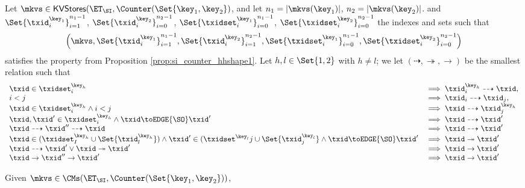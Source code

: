\begin{definition}
\label{def:si_counter_order}
Let $\mkvs \in \mathsf{KVStores}(\ET_{\SI}, \Counter(\Set{\key_1, \key_2})$, and let 
$n_1 = \lvert \mkvs(\key_1) \rvert$, $n_2 = \lvert \mkvs(\key_2) \rvert$. 
and $\Set{\txid_{i}^{\key_1}}_{i=1}^{n_1 - 1}$, $\Set{\txid_{i}^{\key_2}}_{i=0}^{n_2 - 1}$, 
$\Set{\txidset_{i}^{\key_1}}_{i=0}^{n_1-1}$, $\Set{\txidset_{i}^{\key_2}}_{i=0}^{n_2 - 1}$ the indexes 
and sets such that 
\[
    \left(
        \mkvs, \Set{\txid_{i}^{\key_{1}}}_{i=1}^{n_1 - 1}, \Set{\txid^{\key_2}_{i}}_{i=1}^{n_2 - 1}, 
\Set{\txidset_{i}^{\key_1}}_{i=0}^{n_1 - 1}, \Set{\txidset_{i}^{\key_2}}_{i=0}^{n_2-1}
    \right)
\]
satisfies the property from 
Proposition \ref{prop:si_counter_hhshape1}. Let $h, l \in \Set{1,2}$ with $h \neq l$; we 
let $(\dashrightarrow, \twoheadrightarrow, \rightarrow)$ be the smallest relation such that 
\[
\begin{array}{ll}
\txid \in \txidset^{\key_{h}}_{i} &\implies \txid^{\key_{h}}_{i} \dashrightarrow \txid,\\
i < j &\implies \txid_{i} \dashrightarrow \txid_{j},\\
\txid \in \txidset^{\key_{h}}_{i} \land i < j & \implies \txid \dashrightarrow \txid^{\key_{h}}_{j}\\
\txid, \txid' \in \txidset^{\key_{h}}_{i} \land \txid \toEDGE{\SO} \txid' &\implies \txid \dashrightarrow \txid'\\
\txid \dashrightarrow \txid'' \dashrightarrow \txid &\implies \txid \dashrightarrow \txid'\\
\txid \in (\txidset^{\key_{h}}_{I} \cup \Set{\txid^{\key_{h}}_{l}}) \land \txid' \in (\txidset^{\key_{l}}{j} \cup \Set{\txid^{\key_l}_{j}} \land \txid \toEDGE{\SO} \txid' &\implies \txid \twoheadrightarrow \txid'\\
\txid \dashrightarrow \txid' \vee \txid \twoheadrightarrow \txid' &\implies \txid \rightarrow \txid'\\
\txid \rightarrow \txid'' \rightarrow \txid' &\implies \txid \rightarrow \txid'
\end{array}
\]
%
\end{definition}
Given $\mkvs \in \CMs(\ET_{\SI}, \Counter(\Set{\key_1, \key_2}))$, 

